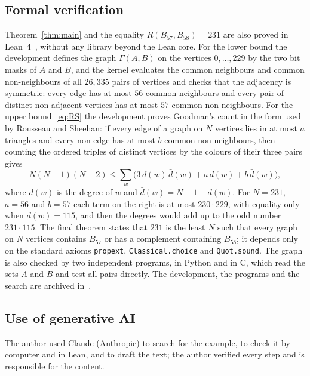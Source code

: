 \documentclass[11pt]{amsart}
\theoremstyle{definition}
\theoremstyle{remark}
\numberwithin{equation}{section}
\begin{document}
\subsection*{Formal verification}
Theorem~\ref{thm:main} and the equality $R(B_{57},B_{58})=231$ are also proved in Lean~4~\cite{MU}, without any library beyond the Lean core. For the lower bound the development defines the graph $\Gamma(A,B)$ on the vertices $0,\dots,229$ by the two bit masks of $A$ and $B$, and the kernel evaluates the common neighbours and common non-neighbours of all $26{,}335$ pairs of vertices and checks that the adjacency is symmetric: every edge has at most $56$ common neighbours and every pair of distinct non-adjacent vertices has at most $57$ common non-neighbours. For the upper bound~\eqref{eq:RS} the development proves Goodman's count in the form used by Rousseau and Sheehan: if every edge of a graph on $N$ vertices lies in at most $a$ triangles and every non-edge has at most $b$ common non-neighbours, then counting the ordered triples of distinct vertices by the colours of their three pairs gives
\[
N(N-1)(N-2)\le\sum_{w}\bigl(3\,d(w)\,\bar d(w)+a\,d(w)+b\,\bar d(w)\bigr),
\]
where $d(w)$ is the degree of $w$ and $\bar d(w)=N-1-d(w)$. For $N=231$, $a=56$ and $b=57$ each term on the right is at most $230\cdot229$, with equality only when $d(w)=115$, and then the degrees would add up to the odd number $231\cdot115$. The final theorem states that $231$ is the least $N$ such that every graph on $N$ vertices contains $B_{57}$ or has a complement containing $B_{58}$; it depends only on the standard axioms \texttt{propext}, \texttt{Classical.choice} and \texttt{Quot.sound}. The graph is also checked by two independent programs, in Python and in C, which read the sets $A$ and $B$ and test all pairs directly. The development, the programs and the search are archived in~\cite{Ar}.

\subsection*{Use of generative AI}
The author used Claude (Anthropic) to search for the example, to check it by computer and in Lean, and to draft the text; the author verified every step and is responsible for the content.
\end{document}
